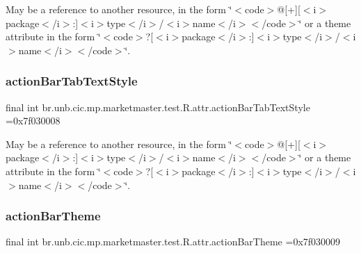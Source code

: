 May be a reference to another resource, in the form \char`\"{}$<$code$>$@\mbox{[}+\mbox{]}\mbox{[}$<$i$>$package$<$/i$>$\+:\mbox{]}$<$i$>$type$<$/i$>$/$<$i$>$name$<$/i$>$$<$/code$>$\char`\"{} or a theme attribute in the form \char`\"{}$<$code$>$?\mbox{[}$<$i$>$package$<$/i$>$\+:\mbox{]}$<$i$>$type$<$/i$>$/$<$i$>$name$<$/i$>$$<$/code$>$\char`\"{}. \mbox{\label{classbr_1_1unb_1_1cic_1_1mp_1_1marketmaster_1_1test_1_1R_1_1attr_a2a985a206a2238502421f66393cf7c00}} 
\subsubsection{\texorpdfstring{action\+Bar\+Tab\+Text\+Style}{actionBarTabTextStyle}}
{\footnotesize\ttfamily final int br.\+unb.\+cic.\+mp.\+marketmaster.\+test.\+R.\+attr.\+action\+Bar\+Tab\+Text\+Style =0x7f030008\hspace{0.3cm}{\ttfamily [static]}}

May be a reference to another resource, in the form \char`\"{}$<$code$>$@\mbox{[}+\mbox{]}\mbox{[}$<$i$>$package$<$/i$>$\+:\mbox{]}$<$i$>$type$<$/i$>$/$<$i$>$name$<$/i$>$$<$/code$>$\char`\"{} or a theme attribute in the form \char`\"{}$<$code$>$?\mbox{[}$<$i$>$package$<$/i$>$\+:\mbox{]}$<$i$>$type$<$/i$>$/$<$i$>$name$<$/i$>$$<$/code$>$\char`\"{}. \mbox{\label{classbr_1_1unb_1_1cic_1_1mp_1_1marketmaster_1_1test_1_1R_1_1attr_aef63970c0f62d9b28ad9269139837a21}} 
\subsubsection{\texorpdfstring{action\+Bar\+Theme}{actionBarTheme}}
{\footnotesize\ttfamily final int br.\+unb.\+cic.\+mp.\+marketmaster.\+test.\+R.\+attr.\+action\+Bar\+Theme =0x7f030009\hspace{0.3cm}{\ttfamily [static]}}

